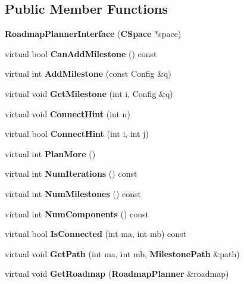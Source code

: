 \subsection*{Public Member Functions}
\begin{DoxyCompactItemize}
\item 
{\bfseries Roadmap\+Planner\+Interface} ({\bf C\+Space} $\ast$space)\label{classRoadmapPlannerInterface_a77adfc0acbb6b5babf35e3a6c18e04c1}

\item 
virtual bool {\bfseries Can\+Add\+Milestone} () const \label{classRoadmapPlannerInterface_a30063c13117e4435fcb364d46eac44bd}

\item 
virtual int {\bfseries Add\+Milestone} (const Config \&q)\label{classRoadmapPlannerInterface_ac75646b8f284e9e5a9f0ec82044e5574}

\item 
virtual void {\bfseries Get\+Milestone} (int i, Config \&q)\label{classRoadmapPlannerInterface_a2fb6766566cb1cdf58174e144890f98c}

\item 
virtual void {\bfseries Connect\+Hint} (int n)\label{classRoadmapPlannerInterface_a70724bfac7e68044dbff6c2d45351f66}

\item 
virtual bool {\bfseries Connect\+Hint} (int i, int j)\label{classRoadmapPlannerInterface_a9b6566d0d74d40e478ed954b96a157ed}

\item 
virtual int {\bfseries Plan\+More} ()\label{classRoadmapPlannerInterface_a8d4e2080b43a34f623e3108dc3e136d3}

\item 
virtual int {\bfseries Num\+Iterations} () const \label{classRoadmapPlannerInterface_a5dbe9b13ce491b487aa68098cbdd8d29}

\item 
virtual int {\bfseries Num\+Milestones} () const \label{classRoadmapPlannerInterface_ab5e87e08db4b8a574d099793fe8a8a59}

\item 
virtual int {\bfseries Num\+Components} () const \label{classRoadmapPlannerInterface_ad35643d1dcdec98d2eed2c5e2eceeeec}

\item 
virtual bool {\bfseries Is\+Connected} (int ma, int mb) const \label{classRoadmapPlannerInterface_a1c02edb8c839114114235c4d0a4abda5}

\item 
virtual void {\bfseries Get\+Path} (int ma, int mb, {\bf Milestone\+Path} \&path)\label{classRoadmapPlannerInterface_adf822a8f0427578c7df8ee0fd0eef5ac}

\item 
virtual void {\bfseries Get\+Roadmap} ({\bf Roadmap\+Planner} \&roadmap)\label{classRoadmapPlannerInterface_ae63cbe356b3fe7c76e0a7fb1987db6f8}

\end{DoxyCompactItemize}
